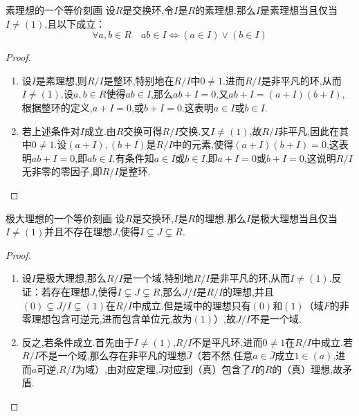 \documentclass[lang=cn,12pt,color=green,fontset=none,pad]{elegantbook}
\begin{document}
\begin{theorem}{素理想的一个等价刻画}
    设$R$是交换环,令$I$是$R$的素理想.那么$I$是素理想当且仅当$I \neq \left( 1 \right)$,且以下成立： $$ \forall a,b\in R\quad ab\in I\iff \left( a\in I \right)\vee \left( b\in I \right)   $$

\end{theorem}
\begin{proof}
    \begin{enumerate}
        \item 设$I$是素理想,则$R/I$是整环,特别地在$R/I$中$0 \neq 1$.进而$R/I$是非平凡的环,从而$I \neq \left( 1 \right)$.设$a,b \in R$使得$ab \in I$,那么$ab+I= 0$.又$ab+I=\left( a+I \right)\left( b+I \right)$,根据整环的定义,$a+I=0$,或$b+I=0$.这表明$a \in I$或$b \in I$.
        \item 若上述条件对$I$成立.由$R$交换可得$R/I$交换.又$I \neq \left( 1 \right)$,故$R/I$非平凡,因此在其中$0 \neq 1$.设$\left( a+I \right),\left( b+I \right)$是$R/I$中的元素,使得$\left( a+I \right)\left( b+I \right)=0$,这表明$ab+I=0$,即$ab \in I$.有条件知$a\in I$或$b \in I$,即$a+I=0$或$b+I=0$,这说明$R/I$无非零的零因子,即$R/I$是整环.
    \end{enumerate}
    
\end{proof}

\begin{theorem}{极大理想的一个等价刻画}
    设$R$是交换环,$I$是$R$的理想.那么$I$是极大理想当且仅当$I \neq \left( 1 \right)$并且不存在理想$J$,使得$I \subsetneq J\subsetneq R$.
\end{theorem}
\begin{proof}
    \begin{enumerate}
        \item  设$I$是极大理想,那么$R/I$是一个域,特别地$R/I$是非平凡的环,从而$I \neq \left( 1 \right)$.反证：若存在理想$J$,使得$I \subsetneq J \subsetneq R$,那么$J/I$是$R/I$的理想,并且$\left( 0 \right)\subsetneq J/I \subsetneq \left( 1 \right)$在$R/I$中成立.但是域中的理想只有$\left( 0 \right)$和$\left( 1 \right)$（域$F$的非零理想包含可逆元,进而包含单位元,故为$\left( 1 \right)$）,故$J/I$不是一个域.
        \item 反之,若条件成立.首先由于$I \neq \left( 1 \right)$,$R/I$不是平凡环,进而$0 \neq 1$在$R/I$中成立.若$R/I$不是一个域,那么存在非平凡的理想$\bar{J}$（若不然,任意$a \in \bar{J}$成立$1 \in \left( a \right)$,进而$a$可逆,$R/I$为域）,由对应定理,$\bar{J}$对应到（真）包含了$I$的$R$的（真）理想,故矛盾.
    \end{enumerate}
    
\end{proof}
\end{document}
